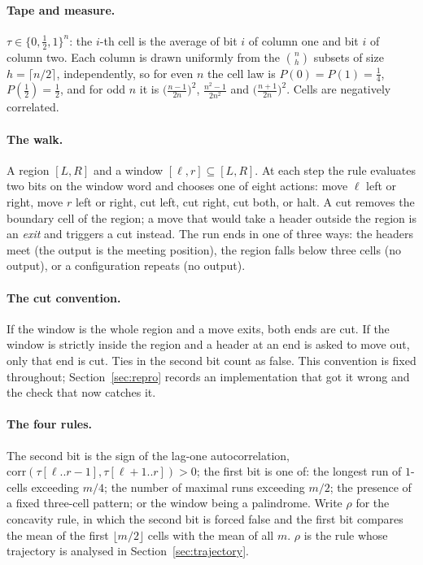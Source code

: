 \documentclass[11pt]{article}
\begin{document}
\paragraph{Tape and measure.} $\tau\in\{0,\tfrac12,1\}^n$: the $i$-th cell is the average of
bit $i$ of column one and bit $i$ of column two. Each column is drawn uniformly from the
$\binom nh$ subsets of size $h=\lceil n/2\rceil$, independently, so for even $n$ the cell
law is $P(0)=P(1)=\tfrac14$, $P(\tfrac12)=\tfrac12$, and for odd $n$ it is
$\big(\frac{n-1}{2n}\big)^2$, $\frac{n^2-1}{2n^2}$ and $\big(\frac{n+1}{2n}\big)^2$. Cells
are negatively correlated.

\paragraph{The walk.} A region $[L,R]$ and a window $[\ell,r]\subseteq[L,R]$. At each step
the rule evaluates two bits on the window word and chooses one of eight actions: move
$\ell$ left or right, move $r$ left or right, cut left, cut right, cut both, or halt. A cut
removes the boundary cell of the region; a move that would take a header outside the
region is an \emph{exit} and triggers a cut instead. The run ends in one of three ways: the
headers meet (the output is the meeting position), the region falls below three cells (no
output), or a configuration repeats (no output).

\paragraph{The cut convention.} If the window is the whole region and a move exits, both
ends are cut. If the window is strictly inside the region and a header at an end is asked
to move out, only that end is cut. Ties in the second bit count as false. This convention
is fixed throughout; Section~\ref{sec:repro} records an implementation that got it wrong
and the check that now catches it.

\paragraph{The four rules.} The second bit is the sign of the lag-one autocorrelation,
$\mathrm{corr}(\tau[\ell..r-1],\tau[\ell+1..r])>0$; the first bit is one of: the longest
run of $1$-cells exceeding $m/4$; the number of maximal runs exceeding $m/2$; the presence
of a fixed three-cell pattern; or the window being a palindrome. Write $\rho$ for the
concavity rule, in which the second bit is forced false and the first bit compares the mean
of the first $\lfloor m/2\rfloor$ cells with the mean of all $m$. $\rho$ is the rule whose
trajectory is analysed in Section~\ref{sec:trajectory}.
\end{document}

